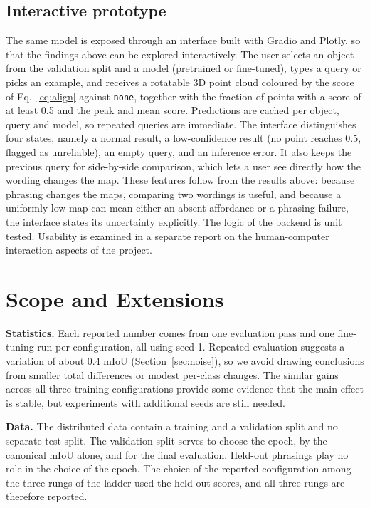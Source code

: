 \documentclass[conference]{IEEEtran}
\begin{document}
\subsection{Interactive prototype}
The same model is exposed through an interface built with Gradio and Plotly, so that the findings above can be explored interactively. The user selects an object from the validation split and a model (pretrained or fine-tuned), types a query or picks an example, and receives a rotatable 3D point cloud coloured by the score of Eq.~\eqref{eq:align} against \texttt{none}, together with the fraction of points with a score of at least 0.5 and the peak and mean score. Predictions are cached per object, query and model, so repeated queries are immediate. The interface distinguishes four states, namely a normal result, a low-confidence result (no point reaches 0.5, flagged as unreliable), an empty query, and an inference error. It also keeps the previous query for side-by-side comparison, which lets a user see directly how the wording changes the map. These features follow from the results above: because phrasing changes the maps, comparing two wordings is useful, and because a uniformly low map can mean either an absent affordance or a phrasing failure, the interface states its uncertainty explicitly. The logic of the backend is unit tested. Usability is examined in a separate report on the human-computer interaction aspects of the project.

\section{Scope and Extensions}
\label{sec:limits}

\textbf{Statistics.} Each reported number comes from one evaluation pass and one fine-tuning run per configuration, all using seed 1. Repeated evaluation suggests a variation of about 0.4 mIoU (Section~\ref{sec:noise}), so we avoid drawing conclusions from smaller total differences or modest per-class changes. The similar gains across all three training configurations provide some evidence that the main effect is stable, but experiments with additional seeds are still needed.

\textbf{Data.} The distributed data contain a training and a validation split and no separate test split. The validation split serves to choose the epoch, by the canonical mIoU alone, and for the final evaluation. Held-out phrasings play no role in the choice of the epoch. The choice of the reported configuration among the three rungs of the ladder used the held-out scores, and all three rungs are therefore reported.
\end{document}
